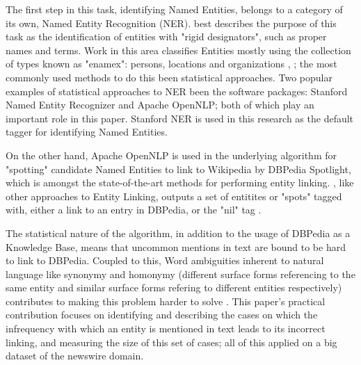 The first step in this task, identifying Named Entities, belongs to a category of its own, Named Entity Recognition (NER).
\cite{rw_elo_Nadeau2009} best describes the purpose of this task as the identification of entities with "rigid designators",
such as proper names and terms. Work in this area classifies Entities mostly using the collection of types known as "enamex": persons, locations and organizations \cite{rw_elo_Nadeau2009},
; the most commonly used methods to do this been statistical approaches.
Two popular examples of statistical approaches to NER been the software packages: Stanford Named Entity Recognizer\cite{rw_elo_finkel2005} and Apache OpenNLP\cite{rw_elo_kottmann2011};
both of which play an important role in this paper. Stanford NER is used in this research as the default tagger for identifying Named Entities.

On the other hand, Apache OpenNLP is used in the underlying algorithm for "spotting" candidate Named Entities to link to Wikipedia by DBPedia Spotlight\cite{rw_elo_isem2013daiber},
which is amongst the state-of-the-art methods for performing entity linking. \cite{rw_elo_isem2013daiber}, like other approaches to Entity Linking, outputs a set of entitites or "spots" tagged with, either a link to an entry in DBPedia\cite{rw_elo_morsey2012dbpedia}, or the "nil" tag \cite{rw_elo_HACHEY2013130}. 


The statistical nature of the algorithm, in addition to the usage of DBPedia as a Knowledge Base, means that uncommon mentions in text are bound to be hard to link
to DBPedia.
Coupled to this, Word ambiguities inherent to natural language like synonymy and homonymy (different surface forms referencing to the same entity and similar surface forms refering to different entities respectively) contributes to making this problem harder to solve \cite{probabilistic}.
This paper's practical contribution focuses on identifying and describing the cases on which the infrequency with which an entity is mentioned in text
leads to its incorrect linking,
and measuring the size of this set of cases; all of this applied on a big dataset of the newswire domain.

